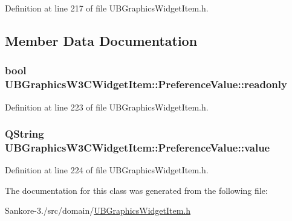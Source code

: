 Definition at line 217 of file U\-B\-Graphics\-Widget\-Item.\-h.



\subsection{Member Data Documentation}
\hypertarget{class_u_b_graphics_w3_c_widget_item_1_1_preference_value_a98a4b9dd07dc4c7698ac673a2aeb8a3a}{
\subsubsection[{readonly}]{\setlength{\rightskip}{0pt plus 5cm}bool U\-B\-Graphics\-W3\-C\-Widget\-Item\-::\-Preference\-Value\-::readonly}}\label{de/ddd/class_u_b_graphics_w3_c_widget_item_1_1_preference_value_a98a4b9dd07dc4c7698ac673a2aeb8a3a}


Definition at line 223 of file U\-B\-Graphics\-Widget\-Item.\-h.

\hypertarget{class_u_b_graphics_w3_c_widget_item_1_1_preference_value_ab87f9f4e2ad782d6f0db8a7e4cff42ab}{
\subsubsection[{value}]{\setlength{\rightskip}{0pt plus 5cm}Q\-String U\-B\-Graphics\-W3\-C\-Widget\-Item\-::\-Preference\-Value\-::value}}\label{de/ddd/class_u_b_graphics_w3_c_widget_item_1_1_preference_value_ab87f9f4e2ad782d6f0db8a7e4cff42ab}


Definition at line 224 of file U\-B\-Graphics\-Widget\-Item.\-h.



The documentation for this class was generated from the following file\-:\begin{DoxyCompactItemize}
\item 
Sankore-\/3./src/domain/\hyperlink{_u_b_graphics_widget_item_8h}{U\-B\-Graphics\-Widget\-Item.\-h}\end{DoxyCompactItemize}
